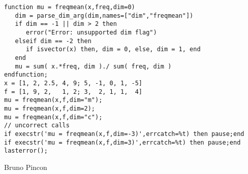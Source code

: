 \begin{examples}

\begin{Verbatim}
function mu = freqmean(x,freq,dim=0)
   dim = parse_dim_arg(dim,names=["dim","freqmean"])
   if dim == -1 || dim > 2 then
      error("Error: unsupported dim flag")
   elseif dim == -2 then
      if isvector(x) then, dim = 0, else, dim = 1, end
   end
   mu = sum( x.*freq, dim )./ sum( freq, dim )
endfunction;
x = [1, 2, 2.5, 4, 9; 5, -1, 0, 1, -5]
f = [1, 9, 2,   1, 2; 3,  2, 1, 1,  4]
mu = freqmean(x,f,dim="m");
mu = freqmean(x,f,dim=2);
mu = freqmean(x,f,dim="c");
// uncorrect calls
if execstr('mu = freqmean(x,f,dim=-3)',errcatch=%t) then pause;end
if execstr('mu = freqmean(x,f,dim=3)',errcatch=%t) then pause;end
lasterror();
\end{Verbatim}
\end{examples}

\begin{manseealso}
\end{manseealso}

\begin{authors}
  Bruno Pincon
\end{authors}


